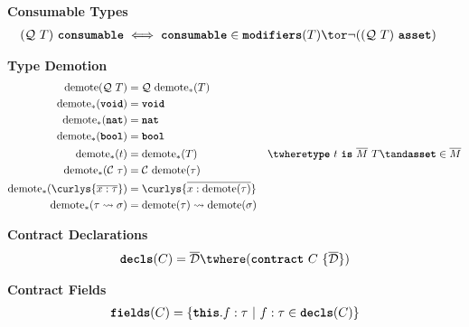 \documentclass[10pt]{article}
\begin{document}
\framebox{$\tau~\consumable$} \textbf{Consumable Types}
\begin{align*}
    (\mathcal{Q}~T)~\consumable &\iff \consumable \in \modifiers(T) \tor \lnot((\mathcal{Q}~T)~\asset)
\end{align*}

\framebox{$\demote(\tau) = \sigma$}
 \textbf{Type Demotion}
\begin{align*}
    \demote(\mathcal{Q}~T) &= \mathcal{Q}~\demote_*(T) \\
    \demote_*(\voidt) &= \voidt \\
    \demote_*(\natt) &= \natt \\
    \demote_*(\boolt) &= \boolt \\
    \demote_*(t) &= \demote_*(T) & \twhere \type~t~\is~\overline{M}~T \tand \asset \in \overline{M} \\
    \demote_*(\mathcal{C}~\tau) &= \mathcal{C}~\demote(\tau) \\
    \demote_*(\curlys{\overline{x : \tau}}) &= \curlys{\overline{x : \demote(\tau)}} \\
    \demote_*(\tau \transforms \sigma) &= \demote(\tau) \transforms \demote(\sigma)
\end{align*}

 \textbf{Contract Declarations}
\begin{align*}
    \decls(C) = \overline{\mathcal{D}} \twhere (\contract~C~\{ \overline{\mathcal{D}} \})
\end{align*}

 \textbf{Contract Fields}
\begin{align*}
    \textbf{\texttt{fields}}(C) = \left\{ {\textbf{\texttt{this}}.f : \tau} ~|~ {f : \tau \in \textbf{\texttt{decls}}(C)} \right\}
\end{align*}
\end{document}
